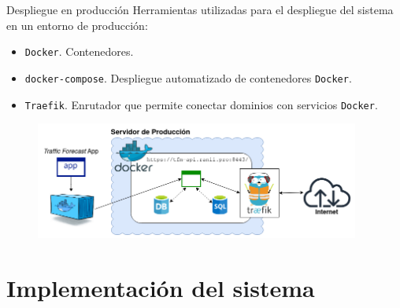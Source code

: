 \documentclass[aspectratio=169,xcolor=dvipsnames]{beamer}
\begin{document}
	
	\begin{frame}{Despliegue en producción}
		Herramientas utilizadas para el despliegue del sistema en un entorno de producción:
		
		\begin{itemize}
			\item \texttt{Docker}. Contenedores.
			\item \texttt{docker-compose}. Despliegue automatizado de contenedores \texttt{Docker}.
			\item \texttt{Traefik}. Enrutador que permite conectar dominios con servicios \texttt{Docker}.
		\end{itemize}
	
		\begin{figure}[h!]
			\begin{center}
				\includegraphics[width=0.95\textwidth]{diag/produccion_tfm.png}
			\end{center}
		\end{figure}
	\end{frame}
	
	
	\section{Implementación del sistema}
	
\end{document}
